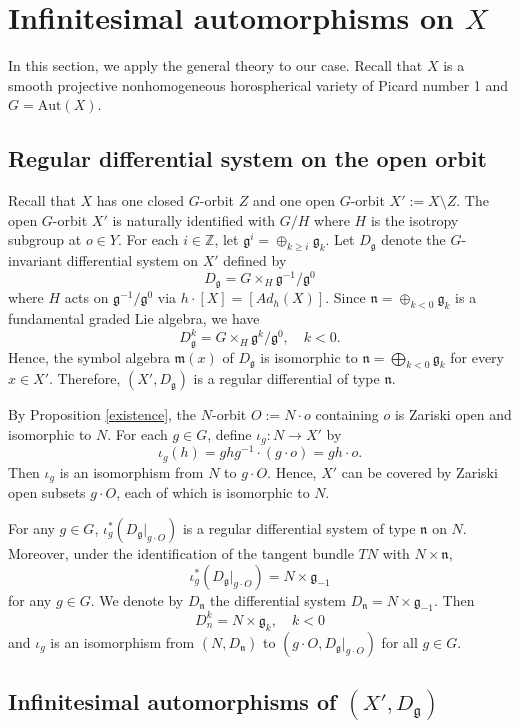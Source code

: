 \documentclass{amsart}
\theoremstyle{definition}
\theoremstyle{remark}
\newcommand{\Z}{\mathbb{Z}}
\newcommand{\g}{\mathfrak{g}}
\newcommand{\m}{\mathfrak{m}}
\newcommand{\n}{\mathfrak{n}}
\begin{document}
\section{Infinitesimal automorphisms on $X$}

In this section, we apply the general theory to our case. Recall that $X$ is a smooth projective nonhomogeneous horospherical variety of Picard number 1 and $G = \mathrm{Aut}(X)$. 


\subsection{Regular differential system on the open orbit}

Recall that $X$ has one closed \(G\)-orbit \(Z\) and one open \(G\)-orbit $X' := X \setminus Z$. The open $G$-orbit $X'$ is naturally identified with $G/H$ where \(H\) is the isotropy subgroup at \(o \in Y\). For each $i \in \Z$, let $\mathfrak{g}^i = \oplus_{k \geq i} \mathfrak{g}_k$. Let $D_\g$ denote the $G$-invariant differential system on $X'$ defined by   
\[D_\g = G \times_H \g^{-1} / \g^0\]
where $H$ acts on $\g^{-1}/\g^0$ via $h \cdot [X] = [Ad_h(X)]$. Since \(\n = \oplus_{k < 0} \mathfrak{g}_k\) is a fundamental graded Lie algebra, we have \[D_\g^k = G \times_H \mathfrak{g}^k / \mathfrak{g}^0, \quad k < 0.\]
Hence, the symbol algebra $\m(x)$ of $D_\g$ is isomorphic to $\n = \bigoplus_{k < 0} \g_k$ for every $x \in X'$. Therefore, $(X', D_\g)$ is a regular differential of type $\n$.

By Proposition \ref{existence}, the $N$-orbit \(O := N \cdot o\) containing $o$ is Zariski open and isomorphic to \(N\). For each \(g \in G\), define $\iota_g : N \to X'$ by 
\[\iota_g(h) = ghg^{-1} \cdot (g\cdot o) = gh \cdot o.\] 
Then $\iota_g$ is an isomorphism from $N$ to $g \cdot O$. Hence, \(X'\) can be covered by Zariski open subsets \(g \cdot O\), each of which is isomorphic to \(N\).

For any $g \in G$, $\iota_g^*(D_\g|_{g \cdot O})$ is a regular differential system of type $\n$ on $N$. Moreover, under the identification of the tangent bundle $TN$ with $N \times \n$, 
\[\iota_g^*(D_\g|_{g \cdot O}) = N \times \g_{-1}\]
for any $g \in G$. We denote by $D_\n$ the differential system $D_\n = N \times \g_{-1}$.
Then 
\[D_n^k = N \times \g_k, \quad k < 0\]
and $\iota_g$ is an isomorphism from \((N, D_\n)\) to \((g \cdot O, D_\g|_{g\cdot O})\) for all $g \in G$.



\subsection{Infinitesimal automorphisms of $(X', D_\g)$}
\end{document}
